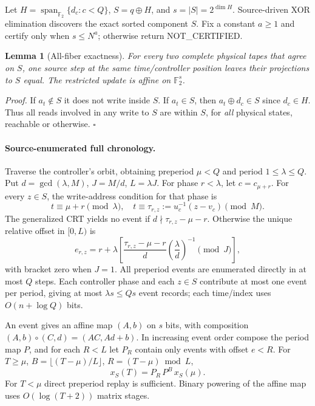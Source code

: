 \documentclass[11pt]{article}
\newtheorem{lemma}{Lemma}
\begin{document}
Let $H=\operatorname{span}_{\mathbb F_2}\{d_c:c<Q\}$,
$S=q\oplus H$, and $s=|S|=2^{\dim H}$. Source-driven XOR elimination
discovers the exact sorted component $S$. Fix a constant $a\ge1$
and certify only when $s\le N^a$; otherwise return NOT\_CERTIFIED.

\begin{lemma}[All-fiber exactness]
For every two complete physical tapes that agree on $S$, one source
step at the same time/controller position leaves their projections
to $S$ equal. The restricted update is affine on $\mathbb F_2^s$.
\end{lemma}
\noindent\emph{Proof.} If $a_t\notin S$ it does not write inside $S$.
If $a_t\in S$, then $a_t\oplus d_c\in S$ since $d_c\in H$.
Thus all reads involved in any write to $S$ are within $S$, for
\emph{all} physical states, reachable or otherwise. \(\square\)

\paragraph{Source-enumerated full chronology.} Traverse the controller's
orbit, obtaining preperiod $\mu<Q$ and period $1\le\lambda\le Q$.
Put $d=\gcd(\lambda,M)$, $J=M/d$, $L=\lambda J$.
For phase $r<\lambda$, let $c=c_{\mu+r}$. For every $z\in S$, the
write-address condition for that phase is
\[
t\equiv\mu+r\pmod\lambda,\quad
t\equiv \tau_{r,z}:=u_c^{-1}(z-v_c)\pmod M.
\]
The generalized CRT yields no event if
$d\nmid\tau_{r,z}-\mu-r$. Otherwise the unique relative offset in
$[0,L)$ is
\[
e_{r,z}
=r+\lambda\left[
\frac{\tau_{r,z}-\mu-r}{d}
\left(\frac{\lambda}{d}\right)^{-1}\!\!\pmod J
\right],
\]
with bracket zero when $J=1$. All preperiod events are enumerated
directly in at most $Q$ steps. Each controller phase and each $z\in S$
contribute at most one event per period, giving at most $\lambda s\le Qs$
event records; each time/index uses $O(n+\log Q)$ bits.

An event gives an affine map $(A,b)$ on $s$ bits, with composition
$(A,b)\circ(C,d)=(AC,Ad+b)$. In increasing event order compose
the period map $P$, and for each $R<L$ let $P_R$ contain only
events with offset $e<R$. For $T\ge\mu$, $B=\lfloor(T-\mu)/L\rfloor$,
$R=(T-\mu)\bmod L$,
\[
x_S(T)=P_R\,P^B\,x_S(\mu).
\]
For $T<\mu$ direct preperiod replay is sufficient.
Binary powering of the affine map uses $O(\log(T+2))$ matrix stages.
\end{document}
